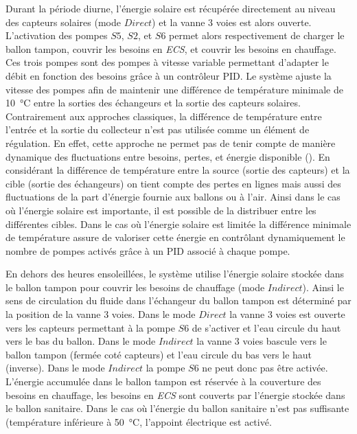 Durant la période diurne, l’énergie solaire est récupérée directement au niveau des
capteurs solaires (mode $Direct$) et la vanne 3 voies est alors ouverte. L’activation des
pompes $S5$, $S2$, et $S6$ permet alors respectivement de charger le ballon tampon,
couvrir les besoins en \emph{ECS}, et couvrir les besoins en chauffage. Ces trois pompes
sont des pompes à vitesse variable permettant d’adapter le débit en fonction des besoins
grâce à un contrôleur PID. Le système ajuste la vitesse des pompes afin de maintenir une
différence de température minimale de \SI{10}{\celsius} entre la sorties des échangeurs et
la sortie des capteurs solaires. Contrairement aux approches classiques, la différence de
température entre l’entrée et la sortie du collecteur n’est pas utilisée comme un élément
de régulation. En effet, cette approche ne permet pas de tenir compte de manière dynamique
des fluctuations entre besoins, pertes, et énergie disponible ().
En considérant la différence de température entre la source (sortie des capteurs) et la
cible (sortie des échangeurs) on tient compte des pertes en lignes mais aussi des
fluctuations de la part d’énergie fournie aux ballons ou à l’air. Ainsi dans le cas où
l’énergie solaire est importante, il est possible de la distribuer
entre les différentes cibles. Dans le cas où l’énergie solaire est limitée la différence
minimale de température assure de valoriser cette énergie en contrôlant dynamiquement le
nombre de pompes activés grâce à un PID associé à chaque pompe.

En dehors des heures ensoleillées, le système utilise l’énergie solaire stockée dans le
ballon tampon pour couvrir les besoins de chauffage (mode $Indirect$). Ainsi le sens de
circulation du fluide dans l’échangeur du ballon tampon est déterminé par la position de
la vanne 3 voies. Dans le mode $Direct$ la vanne 3 voies est ouverte vers les capteurs
permettant à la pompe $S6$ de s’activer et l’eau circule du haut vers le bas du ballon.
Dans le mode $Indirect$ la vanne 3 voies bascule vers le ballon tampon (fermée coté
capteurs) et l’eau circule du bas vers le haut (inverse). Dans le mode $Indirect$ la pompe
$S6$ ne peut donc pas être activée. L’énergie accumulée dans le ballon tampon est réservée
à la couverture des besoins en chauffage, les besoins en \emph{ECS} sont couverts par
l’énergie stockée dans le ballon sanitaire. Dans le cas où l’énergie du ballon sanitaire
n’est pas suffisante (température inférieure à \SI{50}{\celsius}, l’appoint électrique est
activé.

